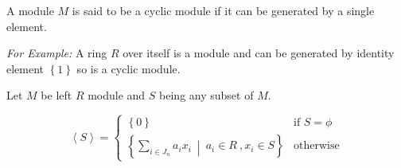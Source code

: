 \begin{definition}
   \cite{Cohn2005}
	A module $M$ is said to be a cyclic module if it can be   generated by a single element.

\end{definition}
\textit{For Example:} 
	A ring $R$ over itself is a module and can be generated by identity element $ \left\lbrace 1\right\rbrace $ so is a cyclic module.
\bigskip

\begin{thm}
	Let $M$ be left $R$ module and $S$ being any subset of $M$.

\begin{equation*}
 \left\langle S\right\rangle =

\begin{cases}
	\left\lbrace 0\right\rbrace & \text{if $S = \phi$} \\ \left\lbrace \sum\limits_{i \in J_n} a_i x_i \ \middle\vert \  a_i \in R \ , x_i \in S\right\rbrace  & \text{otherwise}
	
\end{cases}
	
\end{equation*}

\end{thm}

